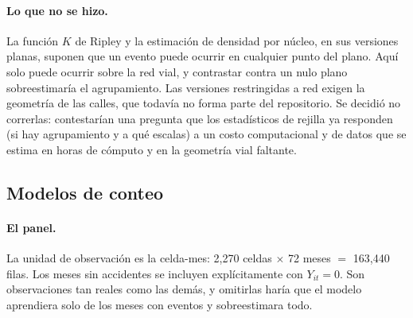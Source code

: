 \paragraph{Lo que no se hizo.} La función $K$ de Ripley y la estimación de
densidad por núcleo, en sus versiones planas, suponen que un evento puede
ocurrir en cualquier punto del plano. Aquí solo puede ocurrir sobre la red
vial, y contrastar contra un nulo plano sobreestimaría el agrupamiento. Las
versiones restringidas a red \parencite{okabe2012network} exigen la geometría de
las calles, que todavía no forma parte del repositorio. Se decidió no
correrlas: contestarían una pregunta que los estadísticos de rejilla ya
responden (si hay agrupamiento y a qué escalas) a un costo computacional y de datos que se estima en horas de cómputo y en la geometría vial faltante.

\subsection{Modelos de conteo}\label{sec:met-conteo}

\paragraph{El panel.} La unidad de observación es la celda-mes: 2,270
celdas $\times$ 72 meses $=$ 163,440 filas. Los meses sin accidentes se
incluyen explícitamente con $Y_{it} = 0$. Son observaciones tan reales como
las demás, y omitirlas haría que el modelo aprendiera solo de los meses con
eventos y sobreestimara todo.


